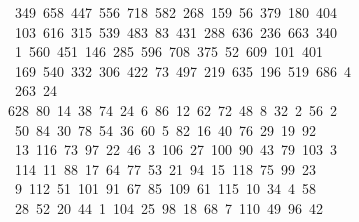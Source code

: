 \begin{tabbing}
\ 349\ 658\ 447\ 556\ 718\ 582\ 268\ 159\ 56\ 379\ 180\ 404\\[0pt]
\>\ 103\ 616\ 315\ 539\ 483\ 83\ 431\ 288\ 636\ 236\ 663\ 340\ \\[0pt]
\ 1\ 560\ 451\ 146\ 285\ 596\ 708\ 375\ 52\ 609\ 101\ 401\\[0pt]
\>\ 169\ 540\ 332\ 306\ 422\ 73\ 497\ 219\ 635\ 196\ 519\ 686\ 4\\[0pt]
\ 263\ 24\ \\[0pt]
628\ 80\ 14\ 38\ 74\ 24\ 6\ 86\ 12\ 62\ 72\ 48\ 8\ 32\ 2\ 56\ 2\\[0pt]
\ 50\ 84\ 30\ 78\ 54\ 36\ 60\ 5\ 82\ 16\ 40\ 76\ 29\ 19\ 92\\[0pt]
\>\ 13\ 116\ 73\ 97\ 22\ 46\ 3\ 106\ 27\ 100\ 90\ 43\ 79\ 103\ 3\\[0pt]
\ 114\ 11\ 88\ 17\ 64\ 77\ 53\ 21\ 94\ 15\ 118\ 75\ 99\ 23\ \\[0pt]
\ 9\ 112\ 51\ 101\ 91\ 67\ 85\ 109\ 61\ 115\ 10\ 34\ 4\ 58\\[0pt]
\>\ 28\ 52\ 20\ 44\ 1\ 104\ 25\ 98\ 18\ 68\ 7\ 110\ 49\ 96\ 42\ \\[0pt]

\end{tabbing}
